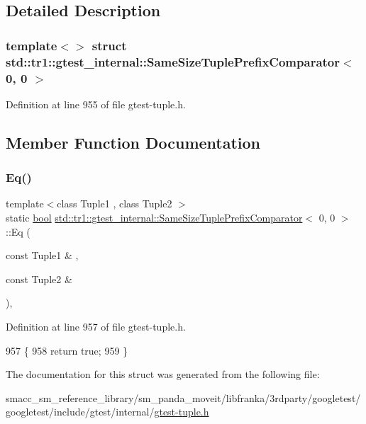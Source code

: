 \subsection{Detailed Description}
\subsubsection*{template$<$$>$\newline
struct std\+::tr1\+::gtest\+\_\+internal\+::\+Same\+Size\+Tuple\+Prefix\+Comparator$<$ 0, 0 $>$}



Definition at line 955 of file gtest-\/tuple.\+h.



\subsection{Member Function Documentation}
\mbox{\label{structstd_1_1tr1_1_1gtest__internal_1_1SameSizeTuplePrefixComparator_3_010_00_010_01_4_a4f209822266c6bb1832c49750a11ef95}} 
\subsubsection{\texorpdfstring{Eq()}{Eq()}}
{\footnotesize\ttfamily template$<$class Tuple1 , class Tuple2 $>$ \\
static \hyperlink{classbool}{bool} \hyperlink{structstd_1_1tr1_1_1gtest__internal_1_1SameSizeTuplePrefixComparator}{std\+::tr1\+::gtest\+\_\+internal\+::\+Same\+Size\+Tuple\+Prefix\+Comparator}$<$ 0, 0 $>$\+::Eq (\begin{DoxyParamCaption}\item[{const Tuple1 \&}]{,  }\item[{const Tuple2 \&}]{ }\end{DoxyParamCaption})\hspace{0.3cm}{\ttfamily [inline]}, {\ttfamily [static]}}



Definition at line 957 of file gtest-\/tuple.\+h.


\begin{DoxyCode}
957                                                    \{
958     \textcolor{keywordflow}{return} \textcolor{keyword}{true};
959   \}
\end{DoxyCode}


The documentation for this struct was generated from the following file\+:\begin{DoxyCompactItemize}
\item 
smacc\+\_\+sm\+\_\+reference\+\_\+library/sm\+\_\+panda\+\_\+moveit/libfranka/3rdparty/googletest/googletest/include/gtest/internal/\hyperlink{gtest-tuple_8h}{gtest-\/tuple.\+h}\end{DoxyCompactItemize}
